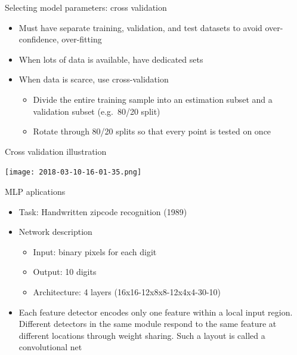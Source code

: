 \documentclass[notes]{beamer}
\providecommand{\tightlist}{%
  \setlength{\itemsep}{0pt}\setlength{\parskip}{0pt}}
\begin{document}
\begin{frame}{Selecting model parameters: cross validation}

\begin{itemize}
\tightlist
\item
  Must have separate training, validation, and test datasets to avoid
  over-confidence, over-fitting
\item
  When lots of data is available, have dedicated sets
\item
  When data is scarce, use cross-validation

  \begin{itemize}
  \tightlist
  \item
    Divide the entire training sample into an estimation subset and a
    validation subset (e.g.~80/20 split)
  \item
    Rotate through 80/20 splits so that every point is tested on once
  \end{itemize}
\end{itemize}

\end{frame}

\begin{frame}{Cross validation illustration}

\centering 

\texttt{[image: 2018-03-10-16-01-35.png]} ~

\end{frame}

\begin{frame}{MLP aplications}

\begin{itemize}
\tightlist
\item
  Task: Handwritten zipcode recognition (1989)
\item
  Network description

  \begin{itemize}
  \tightlist
  \item
    Input: binary pixels for each digit
  \item
    Output: 10 digits
  \item
    Architecture: 4 layers (16x16-12x8x8-12x4x4-30-10)
  \end{itemize}
\item
  Each feature detector encodes only one feature within a local input
  region. Different detectors in the same module respond to the same
  feature at different locations through weight sharing. Such a layout
  is called a convolutional net
\end{itemize}

\end{frame}
\end{document}
